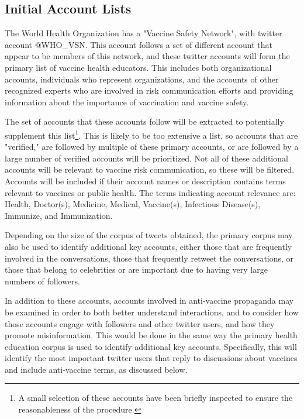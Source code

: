 \documentclass{article}
\begin{document}
\subsection{Initial Account Lists}

The World Health Organization has a "Vaccine Safety Network", with twitter account @WHO\_VSN. This account follows a set of different account that appear to be members of this network, and these twitter accounts will form the primary list of vaccine health educators.  This includes both organizational accounts, individuals who represent organizations, and the accounts of other recognized experts who are involved in risk communication efforts and providing information about the importance of vaccination and vaccine safety.

The set of accounts that these accounts follow will be extracted to potentially supplement this list\footnote{A small selection of these accounts have been briefly inspected to ensure the reasonableness of the procedure.}. This is likely to be too extensive a list, so accounts that are "verified," are followed by multiple of these primary accounts, or are followed by a large number of verified accounts will be prioritized. Not all of these additional accounts will be relevant to vaccine risk communication, so these will be filtered. Accounts will be included if their account names or description contains terms relevant to vaccines or public health. The terms indicating account relevance are: Health, Doctor(s), Medicine, Medical, Vaccine(s), Infectious Disease(s), Immunize, and Immunization.

Depending on the size of the corpus of tweets obtained, the primary corpus may also be used to identify additional key accounts, either those that are frequently involved in the conversations, those that frequently retweet the conversations, or those that belong to celebrities or are important due to having very large numbers of followers.

In addition to these accounts, accounts involved in anti-vaccine propaganda may be examined in order to both better understand interactions, and to consider how those accounts engage with followers and other twitter users, and how they promote misinformation. This would be done in the same way the primary health education corpus is used to identify additional key accounts. Specifically, this will identify the most important twitter users that reply to discussions about vaccines and include anti-vaccine terms, as discussed below.
\end{document}
